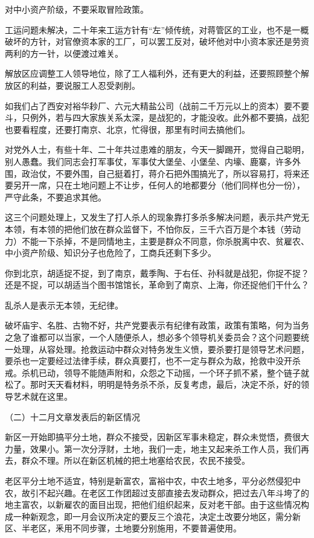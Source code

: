 {对中小资产阶级，不要采取冒险政策。

工运问题未解决，二十年来工运方针有“左”倾传统，对蒋管区的工业，也不是一概破坏的方针，对官僚资本家的工厂，可以罢工反对，破坏他对中小资本家还是劳资两利的方一针，以便渡过难关。

解放区应调整工人领导地位，除了工人福利外，还有更大的利益，还要照顾整个解放区的利益，要说服工人忍受剥削。

如我们占了西安对裕华耖厂、六元大精盐公司（战前二千万元以上的资本）要不要斗，只例外，若与四大家族关系太深，是战犯的，才能没收。此外都不要搞，战犯也要看程度，还要打南京、北京，忙得很，那里有时间去搞他们。

对党外人士，有些十年、二十年共过患难的朋友，今天一脚踢开，觉得自己聪明，别人愚蠢。我们同志会打军事仗，军事仗大堡垒、小堡垒、内壕、鹿寨，许多外围，政治仗，不要外围，自己挺着打，蒋介石把外围搞光了，所以容易打，将来还要另开一席，只在土地问题上不让步，任何人的地都要分（他们同样也分一份），严守此条，不要追求其他。

这三个问题处理上，又发生了打人杀人的现象靠打多杀多解决问题，表示共产党无本领，有本领的把他们放在群众监督下，不怕你反，三千六百万是个本钱（劳动力）不能一下杀掉，不是同情地主，主要是群众不同意，你杀脱离中农、贫雇农、中小资产阶级、知识分子也危险了，工商兵还剩下多少。

你到北京，胡适捉不捉，到了南京，戴季陶、于右任、孙科就是战犯，你捉不捉？还是不捉，可以胡适当个图书馆馆长，革命到了南京、上海，你还捉他们干什么？

乱杀人是表示无本领，无纪律。

破坏庙宇、名胜、古物不好，共产党要表示有纪律有政策，政策有策略，何为当务之急了谁都可以当家，一个人随便杀人，想必多个领导机关委员会？这个问题要统一处理，从容处理。抢救运动中群众对特务发生义愤，要杀要打是领导艺术问题，要杀也一定要经过法律手续，群众真要打，也不一定与群众为敌，抢救中没开杀戒。杀机已动，领导不能随声附和，众怨之下动摇，一个环子抓不紧，整个链子就松了。那时天天看材料，明明是特务杀不杀，反复考虑，最后，决定不杀，好的领导艺术就在这里。

（二）十二月文章发表后的新区情况

新区一开始即搞平分土地，群众不接受，因新区军事未稳定，群众未觉悟，费很大力量，效果小。第一次分浮财，土地，我们一走，地主又起来杀工作人员，我们再去，群众不理。所以在新区机械的把土地塞给农民，农民不接受。

老区平分土地不适宜，特别是新富农，富裕中农，中农土地多，平分必然侵犯中农，故引不起兴趣。在老区工作团超过支部直接去发动群众，把过去八年斗垮了的地主富农，以新雇农的面目出现，把他们组织起来，反对老干部。由于这些情况构成一种新观念，即一月会议所决定的要反三个浪花，决定土改要分地区，需分新区、半老区，釆用不同步骤，土地要分别施用，不要普遍使用。

}
